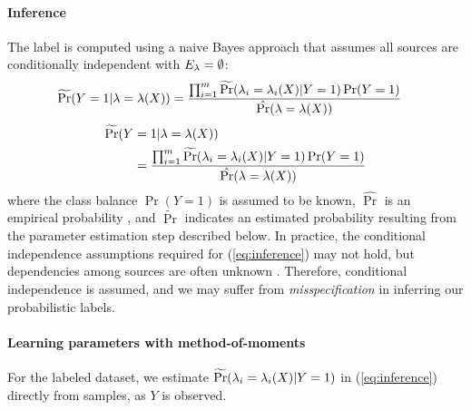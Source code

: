 \paragraph{Inference} The label is computed using a naive Bayes approach that assumes all sources are conditionally independent with $E_{\lambda} = \emptyset$:
\ifsinglecolumn
\begin{align}
    \widetilde{\Pr}(Y &= 1 | \lambda = \lambda(X)) = \frac{\prod_{i = 1}^m \widetilde{\Pr}(\lambda_i = \lambda_i(X) | Y = 1) \Pr(Y = 1)}{\hat{\Pr}(\lambda = \lambda(X))} 
    \label{eq:inference}
\end{align}
\else
\begin{align}
    \widetilde{\Pr}(Y &= 1 | \lambda = \lambda(X)) \nonumber \\
    &= \frac{\prod_{i = 1}^m \widetilde{\Pr}(\lambda_i = \lambda_i(X) | Y = 1) \Pr(Y = 1)}{\hat{\Pr}(\lambda = \lambda(X))} 
    \label{eq:inference}
\end{align}
\fi
where the class balance $\Pr(Y = 1)$ is assumed to be known, $\hat{\Pr}$ is an empirical probability
, and $\widetilde{\Pr}$ indicates an estimated probability resulting from the parameter estimation step described below. %
%
In practice, the conditional independence assumptions required for (\ref{eq:inference}) may not hold, but dependencies among sources are often unknown%
. Therefore, conditional independence is assumed, and we may suffer from \emph{misspecification} in inferring our probabilistic labels. %


\paragraph{Learning parameters with method-of-moments}
For the labeled dataset, we estimate $\widetilde{\Pr}(\lambda_i = \lambda_i(X) | Y = 1)$ in (\ref{eq:inference}) directly from samples, as $Y$ is observed. 

